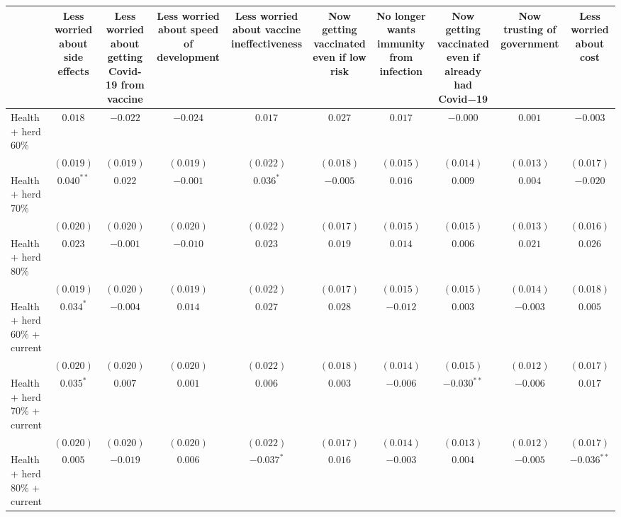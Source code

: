\begin{table}
\begin{center}
\begin{tabular}{l c c c c c c c c c}
\hline
 & Less worried about side effects & Less worried about getting Covid-19 from vaccine & Less worried about speed of development & Less worried about vaccine ineffectiveness & Now getting vaccinated even if low risk & No longer wants immunity from infection & Now getting vaccinated even if already had Covid−19 & Now trusting of government & Less worried about cost \\
\hline
Health + herd 60\%           & $0.018$      & $-0.022$  & $-0.024$  & $0.017$      & $0.027$   & $0.017$   & $-0.000$      & $0.001$   & $-0.003$      \\
                             & $(0.019)$    & $(0.019)$ & $(0.019)$ & $(0.022)$    & $(0.018)$ & $(0.015)$ & $(0.014)$     & $(0.013)$ & $(0.017)$     \\
Health + herd 70\%           & $0.040^{**}$ & $0.022$   & $-0.001$  & $0.036^{*}$  & $-0.005$  & $0.016$   & $0.009$       & $0.004$   & $-0.020$      \\
                             & $(0.020)$    & $(0.020)$ & $(0.020)$ & $(0.022)$    & $(0.017)$ & $(0.015)$ & $(0.015)$     & $(0.013)$ & $(0.016)$     \\
Health + herd 80\%           & $0.023$      & $-0.001$  & $-0.010$  & $0.023$      & $0.019$   & $0.014$   & $0.006$       & $0.021$   & $0.026$       \\
                             & $(0.019)$    & $(0.020)$ & $(0.019)$ & $(0.022)$    & $(0.017)$ & $(0.015)$ & $(0.015)$     & $(0.014)$ & $(0.018)$     \\
Health + herd 60\% + current & $0.034^{*}$  & $-0.004$  & $0.014$   & $0.027$      & $0.028$   & $-0.012$  & $0.003$       & $-0.003$  & $0.005$       \\
                             & $(0.020)$    & $(0.020)$ & $(0.020)$ & $(0.022)$    & $(0.018)$ & $(0.014)$ & $(0.015)$     & $(0.012)$ & $(0.017)$     \\
Health + herd 70\% + current & $0.035^{*}$  & $0.007$   & $0.001$   & $0.006$      & $0.003$   & $-0.006$  & $-0.030^{**}$ & $-0.006$  & $0.017$       \\
                             & $(0.020)$    & $(0.020)$ & $(0.020)$ & $(0.022)$    & $(0.017)$ & $(0.014)$ & $(0.013)$     & $(0.012)$ & $(0.017)$     \\
Health + herd 80\% + current & $0.005$      & $-0.019$  & $0.006$   & $-0.037^{*}$ & $0.016$   & $-0.003$  & $0.004$       & $-0.005$  & $-0.036^{**}$ \\

\end{tabular}
\end{center}
\end{table}
